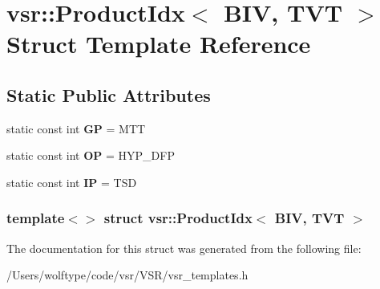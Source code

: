 \hypertarget{structvsr_1_1_product_idx_3_01_b_i_v_00_01_t_v_t_01_4}{\section{vsr\-:\-:Product\-Idx$<$ B\-I\-V, T\-V\-T $>$ Struct Template Reference}
\label{structvsr_1_1_product_idx_3_01_b_i_v_00_01_t_v_t_01_4}
}
\subsection*{Static Public Attributes}
\begin{DoxyCompactItemize}
\item 
\hypertarget{structvsr_1_1_product_idx_3_01_b_i_v_00_01_t_v_t_01_4_add73a990f4b9ec036e2d93f9922eb0f3}{static const int {\bfseries G\-P} = M\-T\-T}\label{structvsr_1_1_product_idx_3_01_b_i_v_00_01_t_v_t_01_4_add73a990f4b9ec036e2d93f9922eb0f3}

\item 
\hypertarget{structvsr_1_1_product_idx_3_01_b_i_v_00_01_t_v_t_01_4_a5c0363162ff2dc0a244a35317d1d4798}{static const int {\bfseries O\-P} = H\-Y\-P\-\_\-\-D\-F\-P}\label{structvsr_1_1_product_idx_3_01_b_i_v_00_01_t_v_t_01_4_a5c0363162ff2dc0a244a35317d1d4798}

\item 
\hypertarget{structvsr_1_1_product_idx_3_01_b_i_v_00_01_t_v_t_01_4_a2e0b53bb32894f3aedc1d99cbd9165a3}{static const int {\bfseries I\-P} = T\-S\-D}\label{structvsr_1_1_product_idx_3_01_b_i_v_00_01_t_v_t_01_4_a2e0b53bb32894f3aedc1d99cbd9165a3}

\end{DoxyCompactItemize}
\subsubsection*{template$<$$>$ struct vsr\-::\-Product\-Idx$<$ B\-I\-V, T\-V\-T $>$}



The documentation for this struct was generated from the following file\-:\begin{DoxyCompactItemize}
\item 
/\-Users/wolftype/code/vsr/\-V\-S\-R/vsr\-\_\-templates.\-h\end{DoxyCompactItemize}
